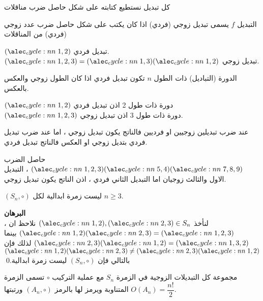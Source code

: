 \begin{corollary}
	كل تبديل نستطيع كتابته على شكل حاصل ضرب مناقلات
\end{corollary}

\begin{definition}
	التبديل $f$ يسمى تبديل زوجي (فردي) اذا كان يكتب على شكل حاصل ضرب عدد زوجي (فردي) من المناقلات
\end{definition}

\begin{example}
	$\cycle{1,2}$ تبديل فردي.\\
	$\cycle{1,2,3} = \cycle{1,3}\cycle{1,2}$ تبديل زوجي.
\end{example}

\begin{lemma}
	الدورة (التباديل) ذات الطول $n$ تكون تبديل فردي اذا كان الطول زوجي والعكس بالعكس.
\end{lemma}

\begin{example}
	$\cycle{1,2}$ دورة ذات طول 2 اذن تبديل فردي\\
	$\cycle{1,2,3}$ دورة ذات طول 3 اذن تبديل زوجي.
\end{example}

\begin{theorem}
	عند ضرب تبديلين زوجيين او فرديين فالناتج يكون تبديل زوجي ، اما عند ضرب تبديل فردي بتديل زوجي او العكس فالناتج تبديل فردي.
\end{theorem}

\begin{example}
	حاصل الضرب $\cycle{1,2,3} \cycle{5,4}\cycle{7,8,9}$ ، التبديل الاول والثالث زوجيان اما التبديل الثاني فردي ، اذن الناتج يكون تبديل زوجي.
\end{example}

\begin{lemma}
	$(S_n, \circ)$ ليست زمرة ابدالية لكل $n\geq 3$.
\end{lemma}
\noindent
\textbf{البرهان}\\
\noindent
لنأخذ $\cycle{1,2}, \cycle{2,3} \in S_n$ نلاحظ ان ، 
$\cycle{1,2}\cycle{2,3} = \cycle{1,2,3}$ بينما
$\cycle{2,3}\cycle{1,2} = \cycle{1,3,2}$
لذلك فإن 
$\cycle{1,2}\cycle{2,3} \neq\cycle{2,3}\cycle{1,2}$
بالتالي فإن $(S_n , \circ)$ ليست زمرة ابدالية.\qed

\begin{definition}
	مجموعة كل التبديلات الزوجية في الزمرة $S_n$ مع عملية التركيب $\circ$ تسمى الزمرة المتناوبة ويرمز لها بالرمز $(A_n, \circ)$ ورتبتها $O(A_n) = \dfrac{n!}{2}$.
\end{definition}

